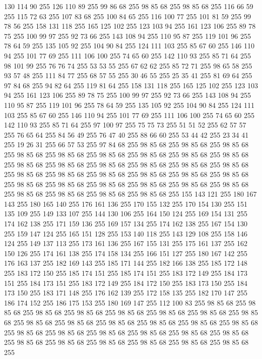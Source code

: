 130 114 90 255 126 110 89 255 99 86 68 255 98 85 68 255 98 85 68 255 116 66 59 255 115 72 63 255 107 83 68 255 100 84 65 255 116 100 77 255 101 81 59 255 99 78 56 255 158 131 118 255 165 125 102 255 123 103 94 255 161 123 106 255 89 78 75 255 100 99 97 255 92 73 66 255 143 108 94 255 110 95 87 255 119 101 96 255 78 64 59 255 135 105 92 255 104 90 84 255 124 111 103 255 85 67 60 255 146 110 94 255 101 77 69 255 111 106 100 255 74 65 60 255 142 110 93 255 85 71 64 255 98 101 99 255 76 76 74 255 53 53 55 255 67 62 62 255 85 72 71 255 98 65 58 255 93 57 48 255 111 84 77 255 68 57 55 255 30 46 55 255 25 35 41 255 81 69 64 255 97 84 68 255 94 82 64 255 119 81 64 255 158 131 118 255 165 125 102 255 123 103 94 255 161 123 106 255 89 78 75 255 100 99 97 255 92 73 66 255 143 108 94 255 110 95 87 255 119 101 96 255 78 64 59 255 135 105 92 255 104 90 84 255 124 111 103 255 85 67 60 255 146 110 94 255
101 77 69 255 111 106 100 255 74 65 60 255 142 110 93 255 85 71 64 255 97 100 97 255 75 75 73 255 51 51 52 255 62 57 57 255 76 65 64 255 84 56 49 255 76 47 40 255 88 66 60 255 53 44 42 255 23 34 41 255 19 26 31 255 66 57 53 255 97 84 68 255 98 85 68 255 98 85 68 255 98 85 68 255 98 85 68 255 98 85 68 255 98 85 68 255 98 85 68 255 98 85 68 255 98 85 68 255 98 85 68 255 98 85 68 255 98 85 68 255 98 85 68 255 98 85 68 255 98 85 68 255 98 85 68 255 98 85 68 255 98 85 68 255 98 85 68 255 98 85 68 255 98 85 68 255 98 85 68 255 98 85 68 255 98 85 68 255 98 85 68 255 98 85 68 255 98 85 68 255 98 85 68 255 98 85 68 255 98 85 68 255 98 85 68 255 155 143 121 255 180 167 143 255 180 165 140 255 176 161 136 255 170 155 132 255 170 154 130 255 151 135 109 255 149 133 107 255 144 130 106 255 164 150 124 255 169 154 131 255 174 162 138 255 171 159 136 255 169 157 134 255 174 162 138 255
167 154 130 255 159 147 124 255 165 151 128 255 153 140 118 255 143 129 108 255 158 146 124 255 149 137 113 255 173 161 136 255 167 155 131 255 175 161 137 255 162 150 126 255 174 161 138 255 174 158 134 255 166 151 127 255 180 167 142 255 176 163 137 255 182 169 143 255 185 171 144 255 182 166 138 255 185 172 148 255 183 172 150 255 185 174 151 255 185 174 151 255 183 172 149 255 184 173 151 255 184 173 151 255 183 172 149 255 184 172 150 255 183 173 150 255 184 173 150 255 183 171 148 255 176 162 139 255 172 158 135 255 182 170 147 255 186 174 152 255 186 175 153 255 180 169 147 255 112 100 83 255 98 85 68 255 98 85 68 255 98 85 68 255 98 85 68 255 98 85 68 255 98 85 68 255 98 85 68 255 98 85 68 255 98 85 68 255 98 85 68 255 98 85 68 255 98 85 68 255 98 85 68 255 98 85 68 255 98 85 68 255 98 85 68 255 98 85 68 255 98 85 68 255 98 85 68 255 98 85 68 255 98 85 68 255 98 85 68 255 98 85 68 255 98 85 68 255 98 85 68 255 98 85 68 255
